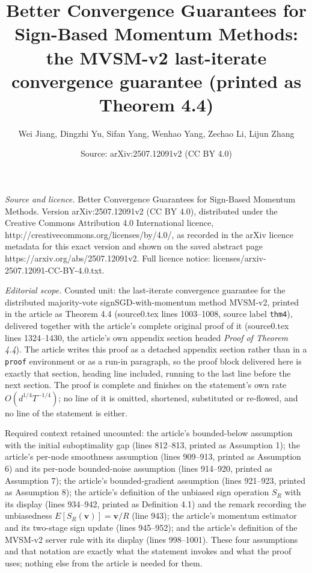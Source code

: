 \documentclass[10pt,a4paper]{amsart}
\title[Better Convergence Guarantees for Sign-Based Momentum Methods]{Better Convergence Guarantees for Sign-Based Momentum Methods: the MVSM-v2 last-iterate convergence guarantee (printed as Theorem 4.4)}
\author{Wei Jiang, Dingzhi Yu, Sifan Yang, Wenhao Yang, Zechao Li, Lijun Zhang}
\date{Source: arXiv:2507.12091v2 (CC BY 4.0)}
\theoremstyle{plain}
\theoremstyle{definition}
\def \v {\mathbf{v}}
\begin{document}
\maketitle

\noindent\emph{Source and licence.} Better Convergence Guarantees for Sign-Based Momentum Methods. Version arXiv:2507.12091v2 (CC BY 4.0), distributed under the Creative Commons Attribution 4.0 International licence, http://creativecommons.org/licenses/by/4.0/, as recorded in the arXiv licence metadata for this exact version and shown on the saved abstract page https://arxiv.org/abs/2507.12091v2. Full licence notice: licenses/arxiv-2507.12091-CC-BY-4.0.txt.\par\smallskip

\noindent\textit{Editorial scope.} Counted unit: the last-iterate convergence guarantee for the distributed majority-vote signSGD-with-momentum method MVSM-v2, printed in the article as Theorem 4.4 (source0.tex lines 1003--1008, source label \texttt{thm4}), delivered together with the article's complete original proof of it (source0.tex lines 1324--1430, the article's own appendix section headed \emph{Proof of Theorem 4.4}). The article writes this proof as a detached appendix section rather than in a \texttt{proof} environment or as a run-in paragraph, so the proof block delivered here is exactly that section, heading line included, running to the last line before the next section. The proof is complete and finishes on the statement's own rate $O(d^{1/4}T^{-1/4})$; no line of it is omitted, shortened, substituted or re-flowed, and no line of the statement is either.

Required context retained uncounted: the article's bounded-below assumption with the initial suboptimality gap (lines 812--813, printed as Assumption 1); the article's per-node smoothness assumption (lines 909--913, printed as Assumption 6) and its per-node bounded-noise assumption (lines 914--920, printed as Assumption 7); the article's bounded-gradient assumption (lines 921--923, printed as Assumption 8); the article's definition of the unbiased sign operation $S_R$ with its display (lines 934--942, printed as Definition 4.1) and the remark recording the unbiasedness $E[S_R(\v)]=\v/R$ (line 943); the article's momentum estimator and its two-stage sign update (lines 945--952); and the article's definition of the MVSM-v2 server rule with its display (lines 998--1001). These four assumptions and that notation are exactly what the statement invokes and what the proof uses; nothing else from the article is needed for them.
\end{document}
